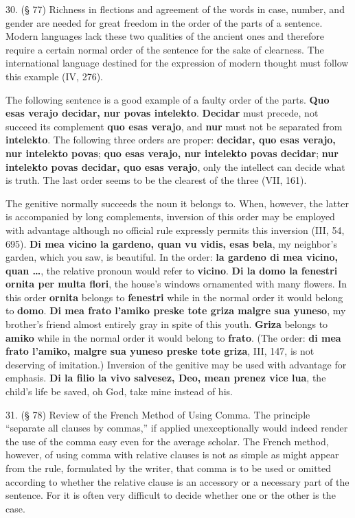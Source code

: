 30. (§ 77) Richness in flections and agreement of the words in case, number, and gender are needed for great freedom in the order of the parts of a sentence. Modern languages lack these two qualities of the ancient ones and therefore require a certain normal order of the sentence for the sake of clearness. The international language destined for the expression of modern thought must follow this example (IV, 276). %

The following sentence is a good example of a faulty order of the parts. \textbf{Quo esas verajo decidar, nur povas intelekto}. \textbf{Decidar} must precede, not succeed its complement \textbf{quo esas verajo}, and \textbf{nur} must not be separated from \textbf{intelekto}. The following three orders are proper: \textbf{decidar, quo esas verajo, nur intelekto povas}; \textbf{quo esas verajo, nur intelekto povas decidar}; \textbf{nur intelekto povas decidar, quo esas verajo}, only the intellect can decide what is truth. The last order seems to be the clearest of the three (VII, 161).

The genitive normally succeeds the noun it belongs to. When, however, the latter is accompanied by long complements, inversion of this order may be employed with advantage although no official rule expressly permits this inversion (III, 54, 695). \textbf{Di mea vicino la gardeno, quan vu vidis, esas bela}, my neighbor's garden, which you saw, is beautiful. In the order: \textbf{la gardeno di mea vicino, quan \ldots}, the relative pronoun would refer to \textbf{vicino}. \textbf{Di la domo la fenestri ornita per multa flori}, the house's windows ornamented with many flowers. In this order \textbf{ornita} belongs to \textbf{fenestri} while in the normal order it would belong to \textbf{domo}. \textbf{Di mea frato l'amiko preske tote griza malgre sua yuneso}, my brother's friend almost entirely gray in spite of this youth. \textbf{Griza} belongs to \textbf{amiko} while in the normal order it would belong to \textbf{frato}. (The order: \textbf{di mea frato l'amiko, malgre sua yuneso preske tote griza}, III, 147, is not deserving of imitation.) Inversion of the genitive may be used with advantage for emphasis. \textbf{Di la filio la vivo salvesez, Deo, mean prenez vice lua}, the child's life be saved, oh God, take mine instead of his.

31. (§ 78) Review of the French Method of Using Comma. The principle ``separate all clauses by commas,'' if applied unexceptionally would indeed render the use of the comma easy even for the average scholar. The French method, however, of using comma with relative clauses is not as simple as might appear from the rule, formulated by the writer, that comma is to be used or omitted according to whether the relative clause is an accessory or a necessary part of the sentence. For it is often very difficult to decide whether one or the other is the case. %

